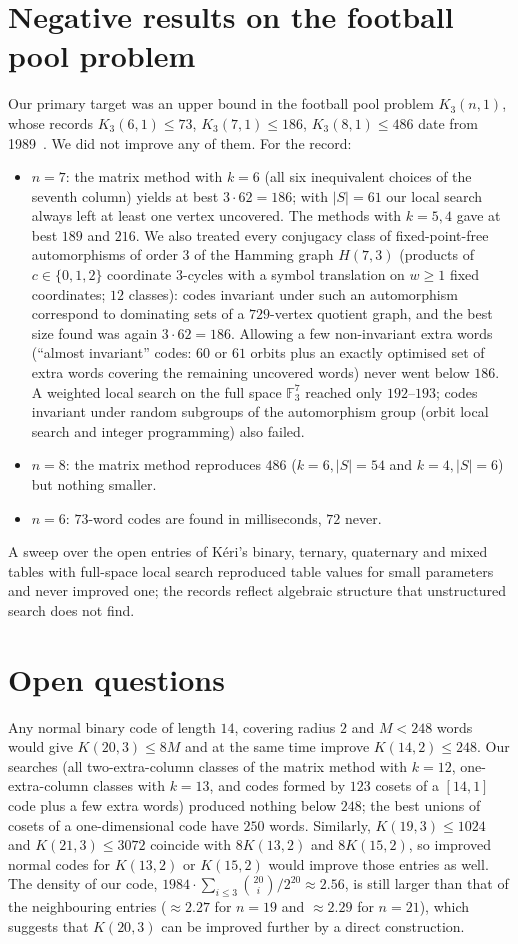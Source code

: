 \documentclass[11pt]{article}
\numberwithin{equation}{section}
\theoremstyle{definition}
\theoremstyle{remark}
\newcommand{\F}{\mathbb F}
\begin{document}
\section{Negative results on the football pool problem}\label{sec:negative}
Our primary target was an upper bound in the football pool problem $K_3(n,1)$, whose records
$K_3(6,1)\le73$, $K_3(7,1)\le186$, $K_3(8,1)\le486$ date from 1989~\cite{vLAvLW89}. We did not improve any
of them. For the record:
\begin{itemize}
\item $n=7$: the matrix method with $k=6$ (all six inequivalent choices of the seventh column) yields at
best $3\cdot62=186$; with $|S|=61$ our local search always left at least one vertex uncovered.
The methods with $k=5,4$ gave at best $189$ and $216$. We also treated every conjugacy class of
fixed-point-free automorphisms of order $3$ of the Hamming graph $H(7,3)$ (products of $c\in\{0,1,2\}$
coordinate $3$-cycles with a symbol translation on $w\ge1$ fixed coordinates; $12$ classes): codes
invariant under such an automorphism correspond to dominating sets of a $729$-vertex quotient graph, and
the best size found was again $3\cdot62=186$. Allowing a few non-invariant extra words (``almost
invariant'' codes: $60$ or $61$ orbits plus an exactly optimised set of extra words covering the
remaining uncovered words) never went below $186$. A weighted local search on the full space $\F_3^7$
reached only $192$--$193$; codes invariant under random subgroups of the automorphism group (orbit local
search and integer programming) also failed.
\item $n=8$: the matrix method reproduces $486$ ($k=6,|S|=54$ and $k=4,|S|=6$) but nothing smaller.
\item $n=6$: $73$-word codes are found in milliseconds, $72$ never.
\end{itemize}
A sweep over the open entries of Kéri's binary, ternary, quaternary and mixed tables with full-space local
search reproduced table values for small parameters and never improved one; the records reflect
algebraic structure that unstructured search does not find.

\section{Open questions}
Any normal binary code of length $14$, covering radius $2$ and $M<248$ words would give
$K(20,3)\le 8M$ and at the same time improve $K(14,2)\le248$. Our searches (all two-extra-column
classes of the matrix method with $k=12$, one-extra-column classes with $k=13$, and codes formed by $123$
cosets of a $[14,1]$ code plus a few extra words) produced nothing below $248$; the best unions of cosets
of a one-dimensional code have $250$ words. Similarly, $K(19,3)\le1024$ and $K(21,3)\le3072$ coincide
with $8K(13,2)$ and $8K(15,2)$, so improved normal codes for $K(13,2)$ or $K(15,2)$ would improve those
entries as well. The density of our code, $1984\cdot\sum_{i\le3}\binom{20}{i}/2^{20}\approx2.56$, is
still larger than that of the neighbouring entries ($\approx2.27$ for $n=19$ and $\approx2.29$ for
$n=21$), which suggests that $K(20,3)$ can be improved further by a direct construction.
\end{document}
